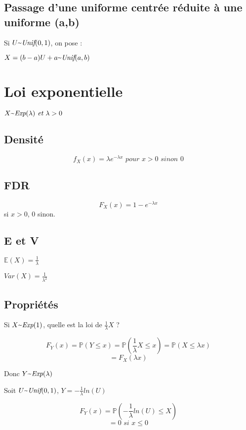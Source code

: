 \documentclass{article}
\newcommand{\textapprox}{\raisebox{0.5ex}{\texttildelow}}
\begin{document}
\subsection{Passage d'une uniforme centrée réduite à une uniforme (a,b)}
Si $U \textapprox \textit{Unif}(0,1)$, on pose :

$X = (b-a)U + a \textapprox \textit{Unif}(a,b)$

\section{Loi exponentielle}

$X \textapprox \textit{Exp}(\lambda) \textit{ et } \lambda > 0$

\subsection{Densité}
$$ f_X(x) = \lambda e^{-\lambda x} \textit{ pour } x > 0 \textit{ sinon } 0$$

\subsection{FDR}

$$ F_X(x) = 1 - e^{-\lambda x} $$ si $x > 0$, $0$ sinon.

\subsection{E et V}

$\mathbb{E}(X) = \frac{1}{\lambda}$

$\textit{Var}(X) = \frac{1}{\lambda^2}$

\subsection{Propriétés}

Si $X \textapprox \textit{Exp}(1)$, quelle est la loi de $\frac{1}{\lambda}X$ ?

$$ F_Y(x) = \mathbb{P}(Y \leq x) = \mathbb{P}(\frac{1}{\lambda} X \leq x) = \mathbb{P}(X \leq \lambda x) $$
$$ = F_X(\lambda x)$$

Donc $Y \textapprox \textit{Exp}(\lambda)$

Soit $U \textapprox \textit{Unif}(0,1)$,
$ Y = - \frac{1}{\lambda} ln(U)$

$$ F_Y(x) = \mathbb{P}(- \frac{1}{\lambda}ln(U) \leq X)$$
$$ = 0 \textit{ si } x \leq 0 $$
\end{document}
